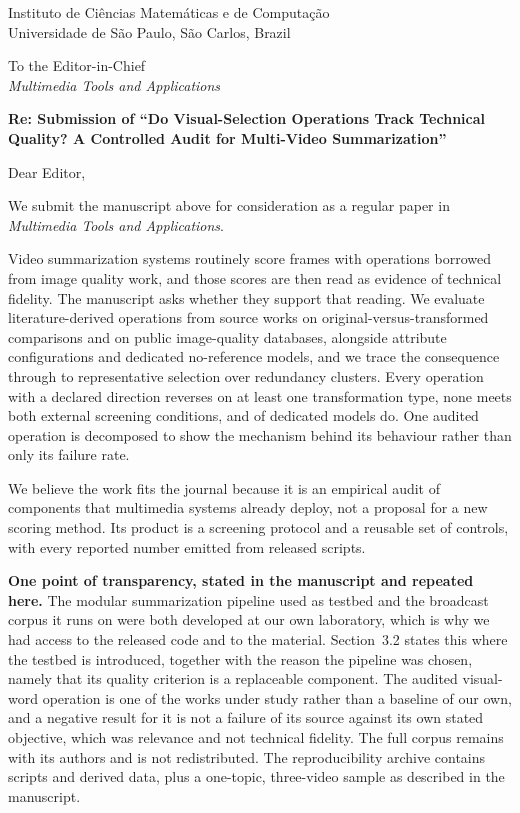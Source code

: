 \documentclass[11pt,a4paper]{article}
\begin{document}
\noindent Instituto de Ci\^{e}ncias Matem\'{a}ticas e de Computa\c{c}\~{a}o\\
Universidade de S\~{a}o Paulo, S\~{a}o Carlos, Brazil

\bigskip
\noindent To the Editor-in-Chief\\
\emph{Multimedia Tools and Applications}

\bigskip
\noindent \textbf{Re: Submission of ``Do Visual-Selection Operations Track Technical
Quality? A Controlled Audit for Multi-Video Summarization''}

\bigskip

Dear Editor,

We submit the manuscript above for consideration as a regular paper in
\emph{Multimedia Tools and Applications}.

Video summarization systems routinely score frames with operations borrowed from
image quality work, and those scores are then read as evidence of technical
fidelity. The manuscript asks whether they support that reading. We evaluate
\fontesDaLiteratura{} literature-derived operations from \fontesTrabalhos{} source
works on \parConstruidos{} original-versus-transformed comparisons and on
\nBases{} public image-quality databases, alongside attribute configurations and
dedicated no-reference models, and we trace the consequence through to
representative selection over \disClusters{} redundancy clusters. Every operation
with a declared direction reverses on at least one transformation type, none meets
both external screening conditions, and \resElegiveis{} of \invModelos{} dedicated
models do. One audited operation is decomposed to show the mechanism behind its
behaviour rather than only its failure rate.

We believe the work fits the journal because it is an empirical audit of components
that multimedia systems already deploy, not a proposal for a new scoring method. Its
product is a screening protocol and a reusable set of controls, with every reported
number emitted from released scripts.

\textbf{One point of transparency, stated in the manuscript and repeated here.} The
modular summarization pipeline used as testbed and the broadcast corpus it runs on
were both developed at our own laboratory, which is why we had access to the
released code and to the material. Section~3.2 states this where the testbed is
introduced, together with the reason the pipeline was chosen, namely that its
quality criterion is a replaceable component. The audited visual-word operation is
one of the works under study rather than a baseline of our own, and a negative
result for it is not a failure of its source against its own stated objective, which
was relevance and not technical fidelity. The full corpus remains with its authors and is not redistributed. The
reproducibility archive contains scripts and derived data, plus a one-topic,
three-video sample as described in the manuscript.
\end{document}
